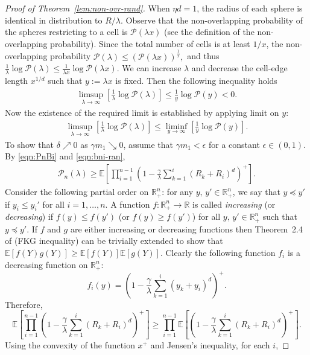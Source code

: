 \documentclass[11pt]{article}
\newcommand{\ee}{\mathbb{E}}
\newcommand{\reals}{\mathbb{R}}
\newcommand{\lt}{\left}
\newcommand{\rt}{\right}
\newcommand{\pno}{\mathcal{P}(\lambda)}
\newcommand{\pnon}{\mathcal{P}_n(\lambda)}
\begin{document}
\begin{appendices}
\begin{proof}[Proof of Theorem~\ref{lem:non-ovr-rand}]
When $\eta d = 1$, {the radius} of each sphere is identical in distribution to $R/\lambda$. Observe that the non-overlapping probability of the spheres restricting to a cell is $\mathcal{P}(\lambda x)$ (see the definition of the non-overlapping probability). Since the total number of cells is at least $1/x$,
the non-overlapping probability $\pno \leq \lt(\mathcal{P}(\lambda x)\rt)^{\frac{1}{x}},$ and thus
$\frac{1}{\lambda} \log \pno \leq \frac{1}{\lambda x}\log \mathcal{P}(\lambda x).$
We can increase $\lambda$ and decrease the cell-edge length $x^{1/d}$ such that $y :=\lambda x$ is fixed. Then the following inequality holds
\begin{align*}
 \limsup_{\lambda \rightarrow \infty} \lt[ \frac{1}{\lambda} \log \pno \rt] \leq \frac{1}{y}\log \mathcal{P}(y) < 0.
\end{align*}
Now the existence of the required limit is established by applying limit on $y$:
\begin{align*}
 \limsup_{\lambda \rightarrow \infty} \lt[ \frac{1}{\lambda} \log \pno \rt] \leq \liminf_{y \rightarrow \infty} \lt[\frac{1}{y}\log \mathcal{P}(y)\rt].
\end{align*}
To show that $\delta \nearrow 0$ as $\gamma m_1 \searrow 0$, assume that $\gamma m_1  < \epsilon$ for a constant $\epsilon \in (0,1)$.
By \eqref{eqn:PnBi} and \eqref{eqn:bni-ran},
\begin{align*}
\pnon \geq \ee\lt[\prod_{i=1}^{n-1} \lt(1 - \frac{\gamma}{\lambda} \sum_{k=1}^{i}(R_k + R_i)^d \rt)^+ \rt].
\end{align*}
Consider the following partial order on $\reals_+^n$: for any $y,\, y' \in \reals_+^n$, we say that $y \preceq y'$ if $y_i \leq y_i'$ for all $i=1,\dots,n$.
A function $f: \reals_+^n \rightarrow \reals$ is called {\it increasing} (or {\it decreasing}) if $f(y) \leq f(y')$ (or $f(y) \geq f(y')$) for all $y, \, y' \in \reals_+^n$
such that $y \preceq y'$. If $f$ and $g$ are either increasing or decreasing functions then Theorem~2.4 of \cite{Grimm99} (FKG inequality) {can be} trivially extended to show that
$\ee[f(Y)g(Y)] \geq \ee[f(Y)] \ee[g(Y)]$. Clearly the following function $f_i$ is a decreasing function {on $\reals_+^n$:}
\[
f_{i}(y) = \lt(1 - \frac{\gamma}{\lambda} \sum_{k=1}^{i}(y_k + y_i)^d \rt)^+.
\]
Therefore,
\[
\ee\lt[\prod_{i=1}^{n-1} \lt(1 - \frac{\gamma}{\lambda} \sum_{k=1}^{i}(R_k + R_i)^d \rt)^+ \rt] \geq \prod_{i=1}^{n-1} \ee\lt[\lt(1 - \frac{\gamma}{\lambda} \sum_{k=1}^{i}(R_k + R_i)^d \rt)^+ \rt].
\]
Using the convexity of the function $x^+$ and Jensen's inequality, for each $i$,

\end{proof}
\end{appendices}
\end{document}
